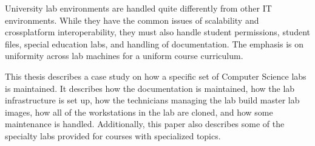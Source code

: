 \thispagestyle{empty}

University lab environments are handled quite differently from other IT environments.  While they have the common issues of scalability and crossplatform interoperability, they must also handle student permissions, student files, special education labs, and handling of documentation.  The emphasis is on uniformity across lab machines for a uniform course curriculum. 

This thesis describes a case study on how a specific set of Computer Science labs is maintained.  It describes how the documentation is maintained, how the lab infrastructure is set up, how the technicians managing the lab build master lab images, how all of the workstations in the lab are cloned, and how some maintenance is handled.  Additionally, this paper also describes some of the specialty labs provided for courses with specialized topics. 
